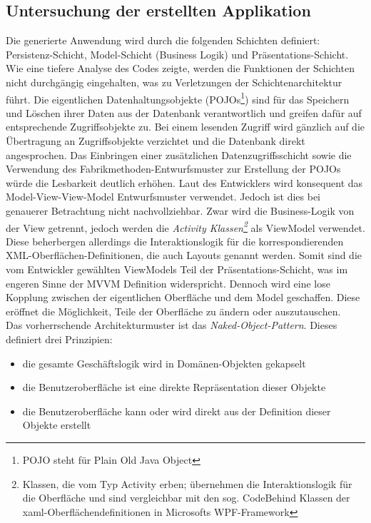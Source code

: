 \documentclass[a4paper,twoside]{article}
\begin{document}
\subsection{Untersuchung der erstellten Applikation}
\label{ssec:untApp}
Die generierte Anwendung wird durch die folgenden Schichten definiert: Persistenz-Schicht, Model-Schicht (Business Logik) und Präsentations-Schicht. Wie eine tiefere Analyse des Codes zeigte, werden die Funktionen der Schichten nicht durchgängig eingehalten, was zu Verletzungen der Schichtenarchitektur führt. Die eigentlichen Datenhaltungsobjekte (POJOs\footnote{POJO steht für Plain Old Java Object}) sind für das Speichern und Löschen ihrer Daten aus der Datenbank verantwortlich und greifen dafür auf entsprechende Zugriffsobjekte zu. Bei einem lesenden Zugriff wird gänzlich auf die Übertragung an Zugriffsobjekte verzichtet und die Datenbank direkt angesprochen. Das Einbringen einer zusätzlichen Datenzugriffsschicht sowie die Verwendung des Fabrikmethoden-Entwurfsmuster zur Erstellung der POJOs würde die Lesbarkeit deutlich erhöhen. %
Laut des Entwicklers wird konsequent das Model-View-View-Model Entwurfsmuster verwendet. Jedoch ist dies bei genauerer Betrachtung nicht nachvollziehbar. Zwar wird die Business-Logik von der View getrennt, jedoch werden die \textit{Activity Klassen\footnote{Klassen, die vom Typ Activity erben; übernehmen die Interaktionslogik für die Oberfläche und sind vergleichbar mit den sog. CodeBehind Klassen der xaml-Oberflächendefinitionen in Microsofts WPF-Framework }} als ViewModel verwendet. Diese beherbergen allerdings die Interaktionslogik für die korrespondierenden XML-Oberflächen-Definitionen, die auch Layouts genannt werden. Somit sind die vom Entwickler gewählten ViewModels Teil der Präsentations-Schicht, was im engeren Sinne der MVVM Definition widerspricht.
Dennoch wird eine lose Kopplung zwischen der eigentlichen Oberfläche und dem Model geschaffen. Diese eröffnet die Möglichkeit, Teile der Oberfläche zu ändern oder auszutauschen.
\\

Das vorherrschende Architekturmuster ist das \textit{Naked-Object-Pattern}. Dieses definiert drei Prinzipien: \begin{itemize}
\item die gesamte Geschäftslogik wird in Domänen-Objekten gekapselt
\item die Benutzeroberfläche ist eine direkte Repräsentation dieser Objekte 
\item die Benutzeroberfläche kann oder wird direkt aus der Definition dieser Objekte erstellt
\end{itemize}
\end{document}
